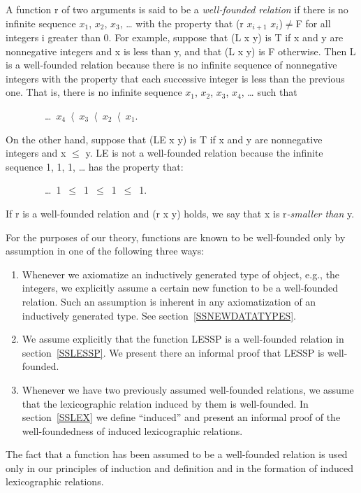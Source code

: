 \documentclass[11pt]{book}
\newenvironment{pubasis}{\begin{flushleft}\ttfamily\small}{\normalsize\rmfamily\end{flushleft}}
\newenvironment{publist}{\begin{enumerate}}{\end{enumerate}}
\newcommand{\pubinlineunderline}[1]{\emph{#1}}
\begin{document}
A function r of two arguments is said to be a \pubinlineunderline{well-founded relation} if
there is no infinite sequence
$x_{1}$, $x_{2}$, $x_{3}$, \ldots{} with the property that
(r $x_{i+1}$ $x_{i}$)$\neq$F for all integers i greater than 0.  
For example, suppose that (L x y) is T if x and y are
nonnegative integers and x is less than y, and that (L x y) is F
otherwise.  Then L is a well-founded relation
because there is no infinite sequence of nonnegative
integers with
the property that each successive integer is less than the previous one.
That is, there is no infinite sequence $x_{1}$, $x_{2}$, $x_{3}$, $x_{4}$, \ldots{} such that
\begin{pubasis}
~~~~~~~~\ldots{}~$x_{4}$~$\langle$~$x_{3}$~$\langle$~$x_{2}$~$\langle$~$x_{1}$.\\
\end{pubasis}
On the other hand, suppose that (LE x y) is T if
x and y are nonnegative integers and x $\leq$ y.  LE is not a well-founded relation
because the infinite sequence 1, 1, 1, \ldots{}
has the property that:
\begin{pubasis}
~~~~~~~~\ldots{}~1~$\leq$~1~$\leq$~1~$\leq$~1.\\
\end{pubasis}
If r is a well-founded  relation
and (r x y) holds, we  say that x is 
r\pubinlineunderline{-smaller than} y.

For the purposes of our theory, functions are known to be well-founded only
by assumption in one of the following three ways:
\begin{publist}
\item Whenever we axiomatize an inductively generated type of object, e.g., the integers,
we explicitly assume a certain new function to be a well-founded relation.
Such
an assumption is inherent in any axiomatization of an inductively generated
type.  See section~\ref{SSNEWDATATYPES}.
\item We assume explicitly that the function LESSP is a well-founded relation in section~\ref{SSLESSP}.
We present there an informal proof that LESSP is well-founded.
\item Whenever we have two previously assumed well-founded relations, we assume
that the lexicographic relation induced by them is well-founded.  In section~\ref{SSLEX}
we define ``induced'' and present an informal proof of the well-foundedness
of induced lexicographic relations.
\end{publist}

The fact that a function has been assumed to be a well-founded relation is used only
in our principles of induction and definition and in the formation of
induced lexicographic  relations.
\end{document}
